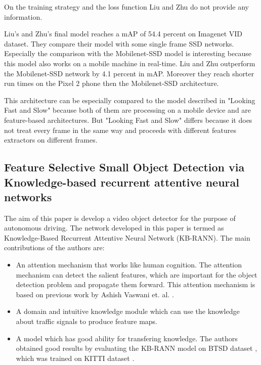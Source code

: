 \documentclass[conference]{IEEEtran}
\begin{document}
On the training strategy and the loss function Liu and Zhu do not provide any information. \newline

Liu's and Zhu's final model reaches a mAP of 54.4 percent on Imagenet VID dataset. They compare their model with some single frame SSD networks. Especially the comparison with the Mobilenet-SSD model is interesting because this model also works on a mobile machine in real-time. Liu and Zhu outperform the Mobilenet-SSD network by 4.1 percent in mAP. Moreover they reach shorter run times on the Pixel 2 phone then the Mobilenet-SSD architecture. \newline

This architecture can be especially compared to the model described in "Looking Fast and Slow" because both of them are processing on a mobile device and are feature-based architectures. But "Looking Fast and Slow" differs because it does not treat every frame in the same way and proceeds with different features extractors on different frames. 

\subsection{Feature Selective Small Object Detection via Knowledge-based recurrent attentive neural networks \cite{b6}}

The aim of this paper is develop a video object detector for the purpose of autonomous driving. The network developed in this paper is termed as Knowledge-Based Recurrent Attentive Neural Network (KB-RANN). \newline
The main contributions of the authors are:
\begin{itemize}
  \item An attention mechanism that works like human cognition. The attention mechanism can detect the salient features, which are important for the object detection problem and propagate them forward. This attention mechanism is based on previous work by Ashish Vaswani et. al. \cite{b30}. 
  \item A domain and intuitive knowledge module which can use the knowledge about traffic signals to produce feature maps.
  \item A model which has good ability for transfering knowledge. The authors obtained good results by evaluating the KB-RANN model on BTSD dataset \cite{b29}, which was trained on KITTI dataset \cite{b21}.
\end{itemize}
\end{document}
